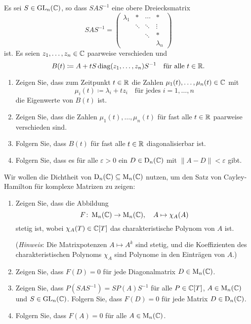 \begin{question}[subtitle = Dichtheit der diagonalisierbaren Matrizen]{4}
  Es sei $S \in \operatorname{GL}_n(\mathbb{C})$, so dass $S A S^{-1}$ eine obere Dreiecksmatrix
  \[
    S A S^{-1}
    =
    \begin{pmatrix}
      \lambda_1 & *       & \cdots  & *         \\
                & \ddots  & \ddots  & \vdots    \\
                &         & \ddots  & *         \\
                &         &         & \lambda_n
    \end{pmatrix}
  \]
  ist.
  Es seien $z_1, \dotsc, z_n \in \mathbb{C}$ paarweise verschieden und
  \[
    B(t)
    \coloneqq
    A + t S \operatorname{\operatorname{diag}}(z_1, \dotsc, z_n) S^{-1}
    \quad
    \text{für alle $t \in \mathbb{R}$}.
  \]
  \begin{enumerate}[leftmargin=*]
    \item
      Zeigen Sie, dass zum Zeitpunkt $t \in \mathbb{R}$ die Zahlen $\mu_1(t), \dotsc, \mu_n(t) \in \mathbb{C}$ mit
      \[
        \mu_i(t) \coloneqq \lambda_i + t z_i
        \quad
        \text{für jedes $i = 1, \dotsc, n$}
      \]
      die Eigenwerte von $B(t)$ ist.
    \item
      Zeigen Sie, dass die Zahlen $\mu_1(t), \dotsc, \mu_n(t)$ für fast alle $t \in \mathbb{R}$ paarweise verschieden sind.
    \item
      Folgern Sie, dass $B(t)$ für fast alle $t \in \mathbb{R}$ diagonalisierbar ist.
    \item
      Folgern Sie, dass es für alle $\varepsilon > 0$ ein $D \in \operatorname{D}_n(\mathbb{C})$ mit $\| A - D \| < \varepsilon$ gibt.
  \end{enumerate}
  Wir wollen die Dichtheit von $\operatorname{D}_n(\mathbb{C}) \subseteq \operatorname{M}_n(\mathbb{C})$ nutzen, um den Satz von Cayley-Hamilton für komplexe Matrizen zu zeigen:
  \begin{enumerate}[leftmargin=*, resume]
    \item
      Zeigen Sie, dass die Abbildung
      \[
        F \colon \operatorname{M}_n(\mathbb{C}) \to \operatorname{M}_n(\mathbb{C}),
        \quad
        A \mapsto \chi_A(A)
      \]
      stetig ist, wobei $\chi_A(T) \in \mathbb{C}[T]$ das charakteristische Polynom von $A$ ist.
      
      (\emph{Hinweis}: Die Matrixpotenzen $A \mapsto A^k$ sind stetig, und die Koeffizienten des charakteristischen Polynoms $\chi_A$ sind Polynome in den Einträgen von $A$.)
      
    \item
      Zeigen Sie, dass $F(D) = 0$ für jede Diagonalmatrix $D \in \operatorname{M}_n(\mathbb{C})$.
    \item
      Zeigen Sie, dass $P(SAS^{-1}) = S P(A) S^{-1}$ für alle $P \in \mathbb{C}[T]$, $A \in \operatorname{M}_n(\mathbb{C})$ und $S \in \operatorname{GL}_n(\mathbb{C})$.
      Folgern Sie, dass $F(D) = 0$ für jede Matrix $D \in \operatorname{D}_n(\mathbb{C})$.
    \item
      Folgern Sie, dass $F(A) = 0$ für alle $A \in \operatorname{M}_n(\mathbb{C})$.
  \end{enumerate}
\end{question}

